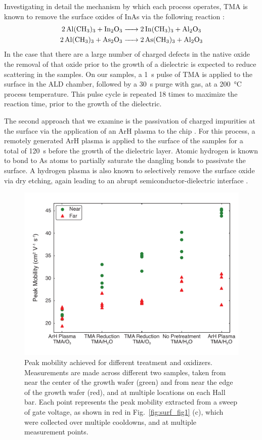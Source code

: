 Investigating in detail the mechanism by which each process operates, TMA is known to remove the surface oxides of InAs via the following reaction \cite{iiiv_cleanup}:
\begin{align}
    \ce{2Al(CH3)3 + In2O3 &-> 2In(CH3)3 + Al2O3} \\
    \ce{2Al(CH3)3 + As2O3 &-> 2As(CH3)3 + Al2O3}
\end{align}
In the case that there are a large number of charged defects in the native oxide the removal of that oxide prior to the growth of a  dielectric is expected to reduce scattering in the samples. On our samples, a \SI{1}{\second} pulse of TMA is applied to the surface in the ALD chamber, followed by a \SI{30}{\second} purge with  gas, at a \SI{200}{\celsius} process temperature. This pulse cycle is repeated 18 times to maximize the reaction time, prior to the growth of the dielectric.

The second approach that we examine is the passivation of charged impurities at the surface via the application of an ArH plasma to the chip \cite{CLEVELAND2013167,BELL1998125,doi:10.1116/1.586538}. For this process, a remotely generated ArH plasma is applied to the surface of the samples for a total of \SI{120}{\second} before the growth of the dielectric layer. Atomic hydrogen is known to bond to As atoms to partially saturate the dangling bonds to passivate the surface. A hydrogen plasma is also known to selectively remove the surface oxide via dry etching, again leading to an abrupt semiconductor-dielectric interface \cite{doi:10.1063/1.92194,doi:10.1063/1.100961}.

\begin{figure}
\includegraphics[width=0.6\linewidth]{Figure3}
\caption[Peak mobilities for each treatment]{\label{fig:surf_fig3} Peak mobility achieved for different treatment and oxidizers. Measurements are made across different two samples, taken from near the center of the growth wafer (green) and from near the edge of the growth wafer (red), and at multiple locations on each Hall bar. Each point represents the peak mobility extracted from a sweep of gate voltage, as shown in red in Fig.~\ref{fig:surf_fig1} (c), which were collected over multiple cooldowns, and at multiple measurement points.}
\end{figure}

